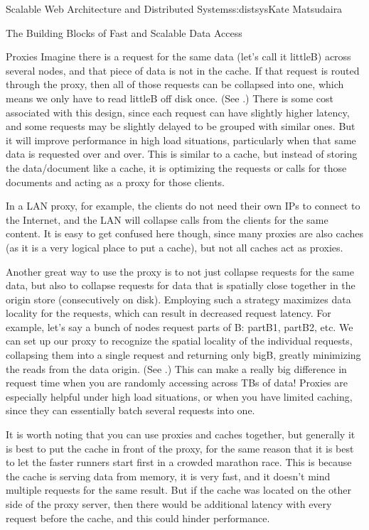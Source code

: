 \begin{aosachapter}{Scalable Web Architecture and Distributed Systems}{s:distsys}{Kate Matsudaira}
\begin{aosasect1}{The Building Blocks of Fast and Scalable Data Access}
\begin{aosasect2}{Proxies}
Imagine there is a request for the same data (let's call it littleB)
across several nodes, and that piece of data is not in the cache. If
that request is routed through the proxy, then all of those requests
can be collapsed into one, which means we only have to read littleB
off disk once. (See .) There is some cost associated with this design, since
each request can have slightly higher latency, and some requests may
be slightly delayed to be grouped with similar ones. But it will
improve performance in high load situations, particularly when that
same data is requested over and over. This is similar to a cache, but
instead of storing the data/document like a cache, it is optimizing
the requests or calls for those documents and acting as a proxy for
those clients. 

In a LAN proxy, for example, the clients do not need
their own IPs to connect to the Internet, and the LAN will collapse
calls from the clients for the same content. It is easy to get
confused here though, since many proxies are also caches (as it is a
very logical place to put a cache), but not all caches act as proxies.


Another great way to use the proxy is to not just collapse requests
for the same data, but also to collapse requests for data that is
spatially close together in the origin store (consecutively on disk).
Employing such a strategy maximizes data locality for the requests,
which can result in decreased request latency. For example, let's say
a bunch of nodes request parts of B: partB1, partB2, etc. We can
set up our proxy to recognize the spatial locality of the individual
requests, collapsing them into a single request and returning only
bigB, greatly minimizing the reads from the data origin. (See .) This can make
a really big difference in request time when you are randomly
accessing across TBs of data! Proxies are especially helpful under
high load situations, or when you have limited caching, since they
can essentially batch several requests into one.


It is worth noting that you can use proxies and caches together, but
generally it is best to put the cache in front of the proxy,
for the same reason that it is best to let the faster runners start first in a
crowded marathon race. This is because the cache is serving data from
memory, it is very fast, and it doesn't mind multiple requests for the
same result. But if the cache was located on the other side of the
proxy server, then there would be additional latency with every
request before the cache, and this could hinder performance.


\end{aosasect2}
\end{aosasect1}
\end{aosachapter}
